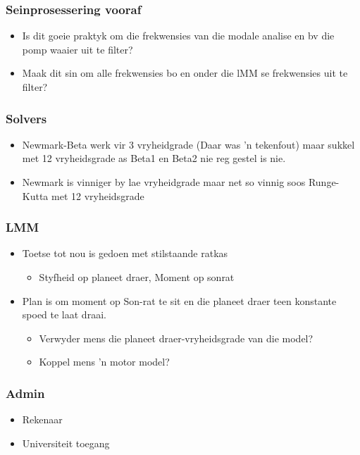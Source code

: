 \documentclass{beamer}
\begin{document}
\begin{frame}
\frametitle{Seinprosessering vooraf}
\begin{itemize}
	\item Is dit goeie praktyk om die frekwensies van die modale analise en bv die pomp waaier uit te filter?
	\item Maak dit sin om alle frekwensies bo en onder die lMM se frekwensies uit te filter? 
\end{itemize}
\end{frame}

\begin{frame}
\frametitle{Solvers}
\begin{itemize}
	\item Newmark-Beta werk vir 3 vryheidgrade (Daar was 'n tekenfout) maar sukkel met 12 vryheidsgrade as Beta1 en Beta2 nie reg gestel is nie.
	\item Newmark is vinniger by lae vryheidgrade maar net so vinnig soos Runge-Kutta met 12 vryheidsgrade
\end{itemize}
\end{frame}

\begin{frame}
\frametitle{LMM}
\begin{itemize}
	\item Toetse tot nou is gedoen met stilstaande ratkas
	\begin{itemize}
		\item Styfheid op planeet draer, Moment op sonrat
	\end{itemize}
	\item Plan is om moment op Son-rat te sit en die planeet draer teen konstante spoed te laat draai.
	\begin{itemize}
		\item Verwyder mens die planeet draer-vryheidsgrade van die model?
		\item Koppel mens 'n motor model?
	\end{itemize}
\end{itemize}
\end{frame}


\begin{frame}
\frametitle{Admin}
\begin{itemize}
	\item Rekenaar
	\item Universiteit toegang 
\end{itemize}
\end{frame}
\end{document}
